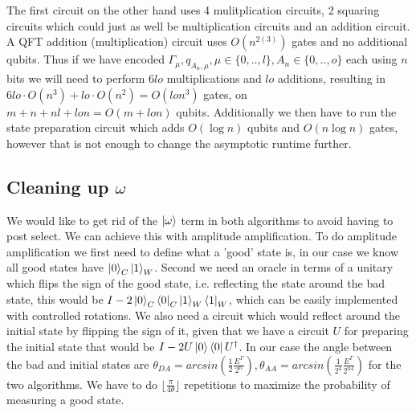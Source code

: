\documentclass{article}
\begin{document}
The first circuit on the other hand uses 4 mulitplication circuits, 2 squaring circuits which could just as well be multiplication circuits and an addition circuit. A QFT addition (multiplication) circuit uses $O(n^{2(3)})$ gates and no additional qubits. Thus if we have encoded $\varGamma_{\mu},q_{A_n,\mu}, \mu \in \{0,..,l\}, A_n \in \{0,..,o\}$ each using $n$ bits we will need to perform $6lo$ multiplications and $lo$ additions, resulting in $6lo\cdot O(n^3)+lo\cdot O(n^2)=O(lon^3)$ gates, on $m+n+nl+lon = O(m+lon)$ qubits.
Additionally we then have to run the state preparation circuit which adds $O(\log n)$ qubits and $O(n\log n)$ gates, however that is not enough to change the asymptotic runtime further. 

\subsection{Cleaning up $\omega$}
We would like to get rid of the $\ket{\omega}$ term in both algorithms to avoid having to post select.
We can achieve this with amplitude amplification. 
To do amplitude amplification we first need to define what a 'good' state is, in our case we know all good states have $\ket{0}_C\ket{1}_W$. 
Second we need an oracle in terms of a unitary which flips the sign of the good state, i.e. reflecting the state around the bad state, this would be $I-2\ket{0}_C\bra{0}_C\ket{1}_W\bra{1}_W$, which can be easily implemented with controlled rotations. 
We also need a circuit which would reflect around the initial state by flipping the sign of it, given that we have a circuit $U$ for preparing the initial state that would be $I-2U\ket{0}\bra{0}U^\dagger$.
In our case the angle between the bad and initial states are $\theta_{DA} = arcsin(\frac{1}{2}\frac{E^\Gamma}{2^n}),\theta_{AA} = arcsin(\frac{1}{2^4}\frac{E^\Gamma}{2^{n4}})$ for the two algorithms. We have to do $\lfloor\frac{\pi}{4\theta}\rfloor$ repetitions to maximize the probability of measuring a good state.%
\end{document}
